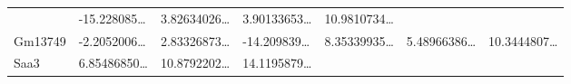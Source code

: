\documentclass[
]{article}
\begin{document}
\begin{longtable}[]{@{}lllllll@{}}
\begin{minipage}[t]{0.12\columnwidth}
\end{minipage} & \begin{minipage}[t]{0.12\columnwidth}\raggedright
-15.228085\ldots{}\strut
\end{minipage} & \begin{minipage}[t]{0.12\columnwidth}\raggedright
3.82634026\ldots{}\strut
\end{minipage} & \begin{minipage}[t]{0.12\columnwidth}\raggedright
3.90133653\ldots{}\strut
\end{minipage} & \begin{minipage}[t]{0.12\columnwidth}\raggedright
10.9810734\ldots{}\strut
\end{minipage}\tabularnewline
\begin{minipage}[t]{0.08\columnwidth}\raggedright
Gm13749\strut
\end{minipage} & \begin{minipage}[t]{0.12\columnwidth}\raggedright
-2.2052006\ldots{}\strut
\end{minipage} & \begin{minipage}[t]{0.12\columnwidth}\raggedright
2.83326873\ldots{}\strut
\end{minipage} & \begin{minipage}[t]{0.12\columnwidth}\raggedright
-14.209839\ldots{}\strut
\end{minipage} & \begin{minipage}[t]{0.12\columnwidth}\raggedright
8.35339935\ldots{}\strut
\end{minipage} & \begin{minipage}[t]{0.12\columnwidth}\raggedright
5.48966386\ldots{}\strut
\end{minipage} & \begin{minipage}[t]{0.12\columnwidth}\raggedright
10.3444807\ldots{}\strut
\end{minipage}\tabularnewline
\begin{minipage}[t]{0.08\columnwidth}\raggedright
Saa3\strut
\end{minipage} & \begin{minipage}[t]{0.12\columnwidth}\raggedright
6.85486850\ldots{}\strut
\end{minipage} & \begin{minipage}[t]{0.12\columnwidth}\raggedright
10.8792202\ldots{}\strut
\end{minipage} & \begin{minipage}[t]{0.12\columnwidth}\raggedright
14.1195879\ldots{}\strut
\end{minipage} & \begin{minipage}[t]{0.12\columnwidth}\raggedright

\end{minipage}
\end{longtable}
\end{document}
